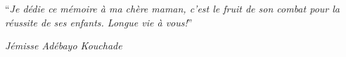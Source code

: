 \begin{dedication}
	\addchaptertocentry{\dedicationname}
	\noindent\enquote{\itshape Je dédie ce mémoire à ma chère maman, c'est le fruit de son combat pour la réussite de ses enfants. Longue vie à vous!}\bigbreak
	
	
	
	\hfill \textit{Jémisse Adébayo Kouchade}
\end{dedication}